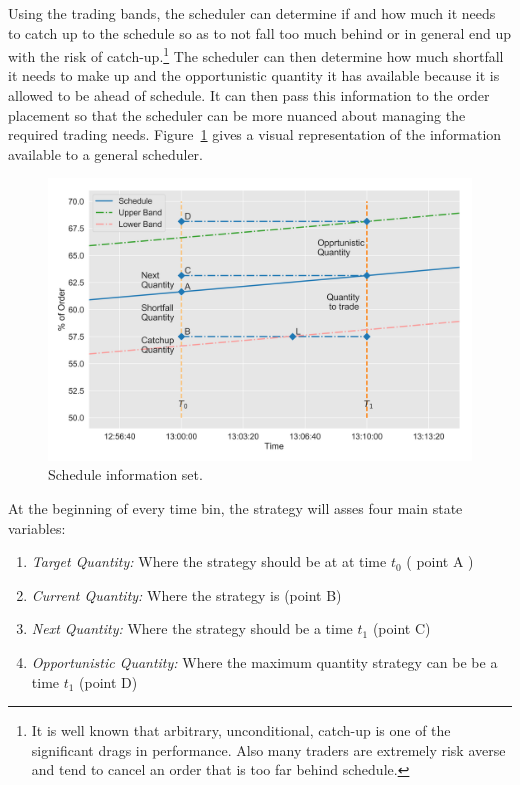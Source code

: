 Using the trading bands, the scheduler can determine if and how much it needs to catch up to the schedule so as to not fall too much behind or in general end up with the risk of catch-up.\footnote{It is well known that arbitrary, unconditional, catch-up is one of the significant drags in performance. Also many traders are extremely risk averse and tend to cancel an order that is too far behind schedule.} The scheduler can then determine how much shortfall it needs to make up and the opportunistic quantity it has available because it is allowed to be ahead of schedule. It can then pass this information to the order placement so that the scheduler can be more nuanced about managing the required trading needs. Figure~\ref{fig:sch_details} gives a visual representation of the information available to a general scheduler.

	\begin{figure}[!ht]
	\centering
	\includegraphics[width=\textwidth]{chapters/chapter_exec_models/figures/schedule_details.png} 
	\caption{Schedule information set. \label{fig:sch_details}}
	\end{figure}

At the beginning of every time bin, the strategy will asses four main state variables:

\begin{enumerate}
\item\emph{Target Quantity:} Where the strategy should be at at time $t_0$ ( point A )
\item\emph{Current Quantity:} Where the strategy is (point B)
\item\emph{Next Quantity:} Where the strategy should be a time $t_1$ (point C)
\item\emph{Opportunistic Quantity:} Where the maximum quantity strategy can be be a time $t_1$ (point D)
\end{enumerate}


